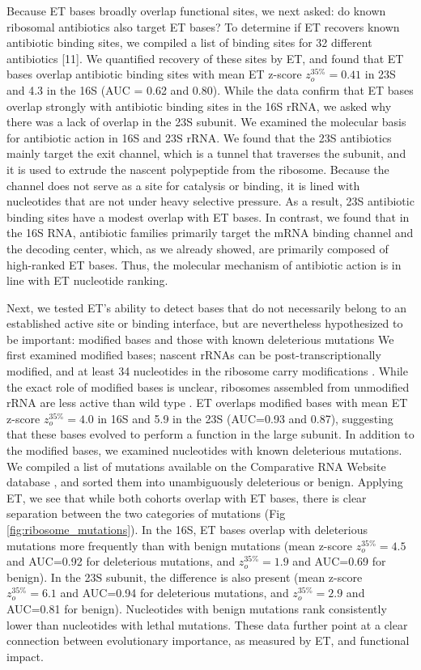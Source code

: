 \documentclass[12pt,a4paper]{report}
\begin{document}
Because ET bases broadly overlap functional sites, we next asked: do known ribosomal antibiotics also target ET bases? To determine if ET recovers known antibiotic binding sites, we compiled a list of binding sites for 32 different antibiotics [11]. We quantified recovery of these sites by ET, and found that ET bases overlap antibiotic binding sites with mean ET z-score $z_{o}^{35\%}=0.41$ in 23S and 4.3 in the 16S (AUC = 0.62 and 0.80). While the data confirm that ET bases overlap strongly with antibiotic binding sites in the 16S rRNA, we asked why there was a lack of overlap in the 23S subunit. We examined the molecular basis for antibiotic action in 16S and 23S rRNA. We found that the 23S antibiotics mainly target the exit channel, which is a tunnel that traverses the subunit, and it is used to extrude the nascent polypeptide from the ribosome. Because the channel does not serve as a site for catalysis or binding, it is lined with nucleotides that are not under heavy selective pressure. As a result, 23S antibiotic binding sites have a modest overlap with ET bases. In contrast, we found that in the 16S RNA, antibiotic families primarily target the mRNA binding channel and the decoding center, which, as we already showed, are primarily composed of high-ranked ET bases. Thus, the molecular mechanism of antibiotic action is in line with ET nucleotide ranking.


Next, we tested ET's ability to detect bases that do not necessarily belong to an established active site or binding interface, but are nevertheless hypothesized to be important: modified bases and those with known deleterious mutations We first examined modified bases; nascent rRNAs can be post-transcriptionally modified, and at least 34 nucleotides in the ribosome carry modifications \cite{Kowalak1995}. While the exact role of modified bases is unclear, ribosomes assembled from unmodified rRNA are less active than wild type \cite{Krzyzosiak1987}. ET overlaps modified bases with mean ET z-score $z_{o}^{35\%}=4.0$  in 16S and 5.9 in the 23S (AUC=0.93 and 0.87), suggesting that these bases evolved to perform a function in the large subunit. In addition to the modified bases, we examined nucleotides with known deleterious mutations. We compiled a list of mutations available on the Comparative RNA Website database \cite{Cannone2002}, and sorted them into unambiguously deleterious or benign. Applying ET, we see that while both cohorts overlap with ET bases, there is clear separation between the two categories of mutations (Fig \ref{fig:ribosome_mutations}). In the 16S, ET bases overlap with deleterious mutations more frequently than with benign mutations (mean z-score $z_{o}^{35\%}=4.5$ and AUC=0.92 for deleterious mutations, and $z_{o}^{35\%}=1.9$  and AUC=0.69 for benign). In the 23S subunit, the difference is also present (mean z-score $z_{o}^{35\%}=6.1$  and AUC=0.94 for deleterious mutations, and $z_{o}^{35\%}=2.9$  and AUC=0.81 for benign). Nucleotides with benign mutations rank consistently lower than nucleotides with lethal mutations. These data further point at a clear connection between evolutionary importance, as measured by ET, and functional impact.
\end{document}
